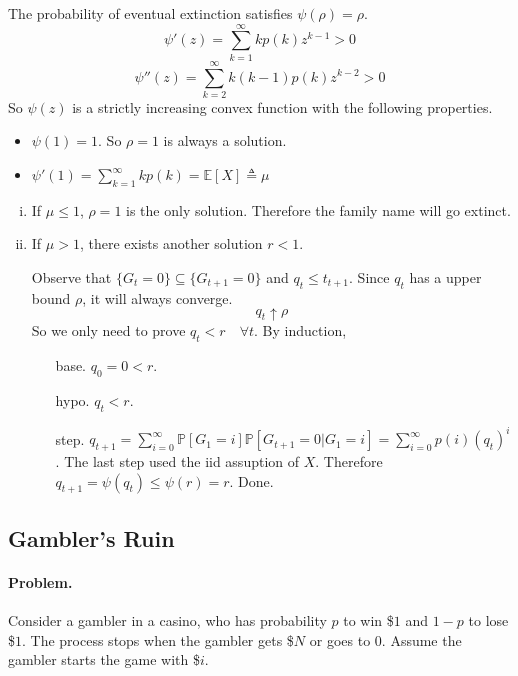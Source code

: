     The probability of eventual extinction satisfies $\psi(\rho) = \rho$.
    \[ \psi'(z) = \sum_{k=1}^{\infty}kp(k)z^{k-1} > 0\]
    \[ \psi''(z) = \sum_{k=2}^{\infty}k(k-1)p(k)z^{k-2} > 0 \]
    So $\psi(z)$ is a strictly increasing convex function with the following properties.
    \begin{itemize}
        \item $\psi(1) = 1$. So $\rho = 1$ is always a solution.
        \item $\psi'(1) = \sum_{k=1}^{\infty}kp(k) = \mathbb{E}[X] \triangleq \mu$
    \end{itemize}
    \begin{enumerate}[(i)]
        \item If $\mu \le 1$, $\rho = 1$ is the only solution. Therefore the family name will go extinct.
        \item If $\mu > 1$, there exists another solution $r<1$.
        
        Observe that $\{ G_t = 0 \} \subseteq \{ G_{t+1} = 0 \}$ and $q_t \le t_{t+1}$. Since $q_t$ has a upper bound $\rho$, it will always converge.
        \[ q_t \uparrow \rho \]
        So we only need to prove $q_t < r \quad \forall t$. By induction,
        \begin{itemize}
            \item[base.] $q_0 = 0 < r$.
            \item[hypo.] $q_t < r$.
            \item[step.] $q_{t+1} = \sum_{i=0}^{\infty}\mathbb{P}[G_1 = i]\mathbb{P}[G_{t+1} = 0| G_1 = i] = \sum_{i=0}^{\infty}p(i)(q_t)^i$. The last step used the iid assuption of $X$. 
            Therefore $q_{t+1} = \psi(q_t) \le \psi(r) = r$. Done.
        \end{itemize} 
    \end{enumerate}

    \subsection{Gambler's Ruin}\label{GamblerRuin}
    \paragraph*{Problem.} Consider a gambler in a casino, who has probability $p$ to win \$$1$ and $1-p$ to lose \$$1$. The process stops when the gambler gets \$$N$ or goes to $0$. Assume the gambler starts the game with \$$i$.
